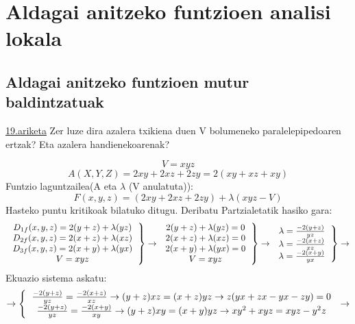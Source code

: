 \chapter{Aldagai anitzeko funtzioen analisi lokala}
\section{Aldagai anitzeko funtzioen mutur baldintzatuak}
\underline{19.ariketa} Zer luze dira azalera txikiena duen V bolumeneko paralelepipedoaren ertzak? Eta azalera handienekoarenak?

\begin{equation*}
    V = xyz
\end{equation*}
\begin{equation*}
    A(X,Y,Z) = 2xy + 2xz + 2zy = 2(xy+xz+xy)
\end{equation*}
\centering Funtzio laguntzailea(A eta $\lambda$ (V anulatuta)):
\begin{equation*}
    F(x,y,z) = (2xy + 2xz + 2zy) + \lambda(xyz-V)
\end{equation*}
\centering Hasteko puntu kritikoak bilatuko ditugu. Deribatu Partzialetatik hasiko gara:
\begin{equation*}
\left.
  \begin{tabular}{ c }
    $D_{1f}(x,y,z)=2(y+z) + \lambda(yz)$ \\
    $D_{2f}(x,y,z)=2(x+z) + \lambda(xz)$ \\
    $D_{3f}(x,y,z)=2(x+y) + \lambda(yx)$ \\
    $V = xyz$ 
    \end{tabular}
  \right\}
  \rightarrow
  \left.
  \begin{tabular}{ c }
    $2(y+z) + \lambda(yz) = 0$ \\
    $2(x+z) + \lambda(xz) = 0$ \\
    $2(x+y) + \lambda(yx) = 0$ \\
    $V = xyz$ 
  \end{tabular}
  \right\}
  \rightarrow
    \left.
  \begin{tabular}{ c }
    $\lambda = \frac{-2(y+z)}{yz}$ \\
    $\lambda = \frac{-2(x+z)}{xz}$ \\
    $\lambda = \frac{-2(x+y)}{yx}$ \\
  \end{tabular}
  \right\}
  \rightarrow
\end{equation*}
\centering Ekuazio sistema askatu:
\begin{equation*}
\rightarrow
  \left\{
  \begin{tabular}{ c }
     $\frac{-2(y+z)}{yz} = \frac{-2(x+z)}{xz} \rightarrow (y+z)xz=(x+z)yz \rightarrow z(yx+zx-yx-zy)=0$\\
     $\frac{-2(y+z)}{yz} = \frac{-2(x+y)}{xy} \rightarrow (y+z)xy=(x+y)yz \rightarrow xy^2 + xyz = xyz -y^2z$
  \end{tabular}
  \right.
  \rightarrow
\end{equation*}
